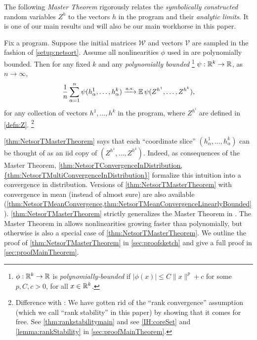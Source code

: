 \documentclass[main.tex]{subfiles}
\begin{document}
The following \emph{Master Theorem} rigorously relates the \emph{symbolically constructed} random variables $Z^h$ to the vectors $h$ in the program and their \emph{analytic limits}.
It is one of our main results and will also be our main workhorse in this paper.

\begin{thm}
\label{thm:NetsorTMasterTheorem} Fix a \netsort{} program. Suppose the initial matrices $\mathcal{W}$ and vectors $\mathcal{V}$ are sampled in the fashion of \cref{setup:netsort}.
Assume all nonlinearities $\phi$ used in  are polynomially bounded. Then for any fixed $k$ and any \emph{polynomially bounded}%
\footnote{
    $\phi: \mathbb{R}^k \to \mathbb{R}$ is \emph{polynomially-bounded} if $|\phi(x)| \le C\|x\|^p + c$ for some $p, C, c > 0$, for all $x \in \mathbb{R}^k$.
}
$\psi:\mathbb{R}^{k}\to\mathbb{R}$, as $n\to\infty$,
\begin{equation}
\f 1n\sum_{\alpha=1}^{n}\psi(h_{\alpha}^{1},\ldots,h_{\alpha}^{k})\asto\EV\psi(Z^{h^{1}},\ldots,Z^{h^{k}}),
\label{eqn:NetsorTMasterTheorem}
\end{equation}
for any collection of vectors $h^{1},\ldots,h^{k}$ in the program, where $Z^{h^{i}}$ are defined in \cref{defn:Z}.%
\footnote{Difference with \cite[Thm 6.3]{yangScalingLimitsWide2019arXiv.org}: We have gotten rid of the ``rank convergence'' assumption (which we call ``rank stability'' in this paper) by showing that it comes for free.
See \cref{thm:rankstabilitymain} and see \ref{IH:coreSet} and \cref{lemma:rankStability} in \cref{sec:proofMainTheorem}.}
\end{thm}
\cref{thm:NetsorTMasterTheorem} says that each ``coordinate slice'' $(h^1_\alpha, \ldots, h^k_\alpha)$ can be thought of as an iid copy of $(Z^{h^1},\ldots, Z^{h^k})$. Indeed, as consequences of the Master Theorem, \cref{thm:NetsorTConvergenceInDistribution,{thm:NetsorTMultiConvergenceInDistribution}} formalize this intuition into a convergence in distribution.
Versions of \cref{thm:NetsorTMasterTheorem} with convergence in mean (instead of almost sure) are also available (\cref{thm:NetsorTMeanConvergence,thm:NetsorTMeanConvergenceLinearlyBounded}).
\cref{thm:NetsorTMasterTheorem} strictly generalizes the Master Theorem in \citet{yangTP2}.
The \netsor{} Master Theorem in \citet{yangTP1} allows nonlinearities growing faster than polynomially, but otherwise is also a special case of \cref{thm:NetsorTMasterTheorem}.
We outline the proof of \cref{thm:NetsorTMasterTheorem} in \cref{sec:proofsketch} and give a full proof in \cref{sec:proofMainTheorem}.
\end{document}
